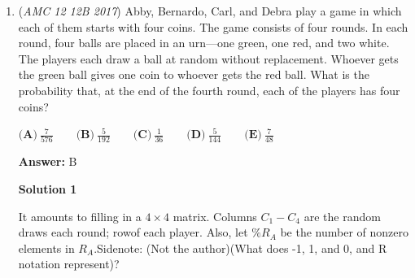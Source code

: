 \begin{enumerate}
 - Lingjun :)

 



\textbf{Solution 6}

Say the sum of the first 6 scores is $n$. Then, we know that $n + 95 \equiv 0 \pmod{7}$. Thus, $n \equiv 3 \pmod{7}$. Additionally, since the average of these 6 scores was an integer, we know that $n \equiv 0 \pmod{6}$. We find that the smallest $n$ to satisfy both of these inequalities is 24 (series below). 
 \[3, 10, 17, 24, ...\] To get to the next one, we have to add $6 \cdot 7 = 42$ so as not to ruin the moduli.

 Next, we know that $n$ is between $91 \cdot 6 = 546$ and $100 \cdot 6 = 600$. It can't take on either value as all the scores have to be different. Now, we calculate the first $n$ that satisfies both moduli equations:

 
 \[546 < 42 + 24x\]
 \[91 < 7 + 4x\]
 \[84 < 4x\]
 \[21 < x\]
$x = 22$ works while $x = 23$ does not (as it hits the upper limit of 600), and we find that $n = 42 + 24 \cdot 22 = 570$. So, the sum of the first 6 scores is 570. We also know that the sum of the first 5 scores is a multiple of 5. Since $5~\mid~570$, the 6th score must be a multiple of 5. 95 is taken, so the only possibility $\boxed{\bold{(E)} 100}$.

 


	\item (\textit{AMC 12 12B 2017}) Abby, Bernardo, Carl, and Debra play a game in which each of them starts with four coins. The game consists of four rounds. In each round, four balls are placed in an urn---one green, one red, and two white. The players each draw a ball at random without replacement. Whoever gets the green ball gives one coin to whoever gets the red ball. What is the probability that, at the end of the fourth round, each of the players has four coins?


 $\textbf{(A)}\ \frac{7}{576} \qquad \textbf{(B)}\ \frac{5}{192} \qquad \textbf{(C)}\ \frac{1}{36} \qquad \textbf{(D)}\ \frac{5}{144} \qquad\textbf{(E)}\ \frac{7}{48}$

 \textbf{Answer: }B



\textbf{Solution 1}

It amounts to filling in a $4 \times 4$ matrix. Columns $C_1 - C_4$ are the random draws each round; rowof each player. Also, let $\%R_A$ be the number of nonzero elements in $R_A$.Sidenote: (Not the author)(What does -1, 1, and 0, and R notation represent)?


\end{enumerate}
